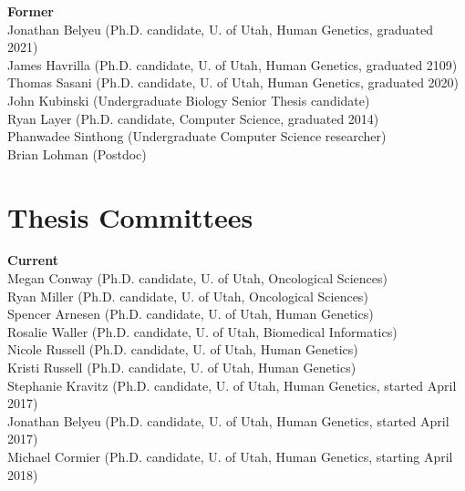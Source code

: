 \documentclass[margin,line]{cv}
\begin{document}
\begin{resume}
    \textbf{Former} \\
    Jonathan Belyeu (Ph.D. candidate, U. of Utah, Human Genetics, graduated 2021) \\
    James Havrilla (Ph.D. candidate, U. of Utah, Human Genetics, graduated 2109) \\
    Thomas Sasani (Ph.D. candidate, U. of Utah, Human Genetics, graduated 2020) \\
    John Kubinski (Undergraduate Biology Senior Thesis candidate)  \\
    Ryan Layer (Ph.D. candidate, Computer Science, graduated 2014) \\
    Phanwadee Sinthong (Undergraduate Computer Science researcher) \\
    Brian Lohman (Postdoc) \\



    \section{\mysidestyle Thesis Committees}
    
    \textbf{Current}\\
    Megan Conway (Ph.D. candidate, U. of Utah, Oncological Sciences)\\
    Ryan Miller (Ph.D. candidate, U. of Utah, Oncological Sciences)\\
    Spencer Arnesen (Ph.D. candidate, U. of Utah, Human Genetics)\\
    Rosalie Waller (Ph.D. candidate, U. of Utah, Biomedical Informatics)\\
    Nicole Russell (Ph.D. candidate, U. of Utah, Human Genetics)\\
    Kristi Russell (Ph.D. candidate, U. of Utah, Human Genetics)\\
    Stephanie Kravitz (Ph.D. candidate, U. of Utah, Human Genetics, started April 2017) \\
    Jonathan Belyeu (Ph.D. candidate, U. of Utah, Human Genetics, started April 2017) \\
    Michael Cormier (Ph.D. candidate, U. of Utah, Human Genetics, starting April 2018) \\



\end{resume}
\end{document}
